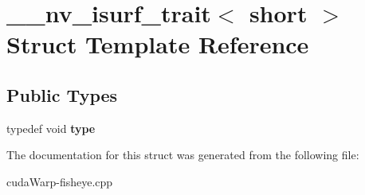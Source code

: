 \hypertarget{struct____nv__isurf__trait_3_01short_01_4}{}\section{\+\_\+\+\_\+nv\+\_\+isurf\+\_\+trait$<$ short $>$ Struct Template Reference}
\label{struct____nv__isurf__trait_3_01short_01_4}
\subsection*{Public Types}
\begin{DoxyCompactItemize}
\item 
typedef void {\bfseries type}\hypertarget{struct____nv__isurf__trait_3_01short_01_4_a30d71a0ebfa987a9f0dce09e8451c774}{}\label{struct____nv__isurf__trait_3_01short_01_4_a30d71a0ebfa987a9f0dce09e8451c774}

\end{DoxyCompactItemize}


The documentation for this struct was generated from the following file\+:\begin{DoxyCompactItemize}
\item 
cuda\+Warp-\/fisheye.\+cpp\end{DoxyCompactItemize}
